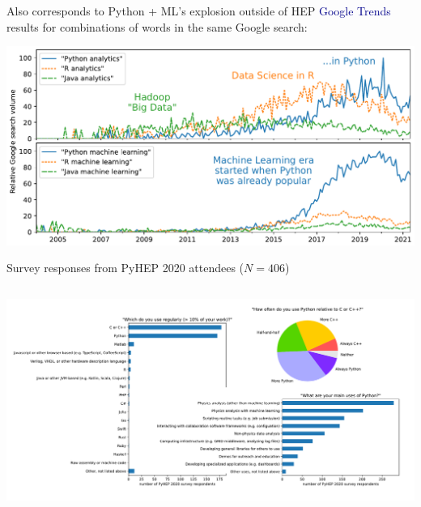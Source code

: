 \documentclass[aspectratio=169]{beamer}
\begin{document}
\begin{frame}{Also corresponds to Python + ML's explosion outside of HEP}
\large
\vspace{0.25 cm}
\textcolor{darkblue}{Google Trends} results for combinations of words in the same Google search:

\vspace{0.25 cm}
\includegraphics[width=\linewidth]{PLOTS/analytics-by-language.pdf}
\end{frame}

\begin{frame}{Survey responses from PyHEP 2020 attendees ($N=406$)}
\vspace{0.25 cm}
\begin{columns}
\includegraphics[width=\linewidth]{PLOTS/pyhep2020-survey-paper.pdf}
\end{columns}
\end{frame}
\end{document}
